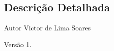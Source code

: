 \subsection{Descrição Detalhada}
\begin{DoxyAuthor}{Autor}
Victor de Lima Soares 
\end{DoxyAuthor}
\begin{DoxyVersion}{Versão}
1. 
\end{DoxyVersion}
